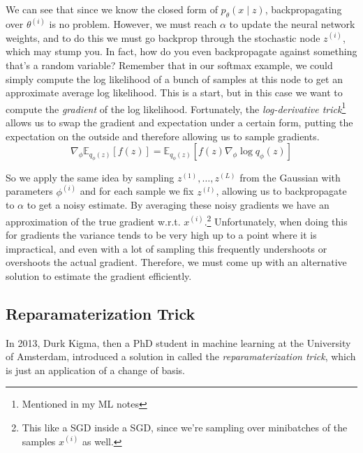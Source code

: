   We can see that since we know the closed form of $p_\theta (x \mid z)$, backpropagating over $\theta^{(i)}$ is no problem. However, we must reach $\alpha$ to update the neural network weights, and to do this we must go backprop through the stochastic node $z^{(i)}$, which may stump you. In fact, how do you even backpropagate against something that's a random variable? Remember that in our softmax example, we could simply compute the log likelihood of a bunch of samples at this node to get an approximate average log likelihood. This is a start, but in this case we want to compute the \textit{gradient} of the log likelihood. Fortunately, the \textit{log-derivative trick}\footnote{Mentioned in my ML notes} allows us to swap the gradient and expectation under a certain form, putting the expectation on the outside and therefore allowing us to sample gradients. 
  \begin{equation}
    \nabla_\phi \mathbb{E}_{q_\phi (z)} [f(z)] = \mathbb{E}_{q_\phi (z)} [ f(z) \nabla_\phi \log q_{\phi} (z)]
  \end{equation}

  So we apply the same idea by sampling $z^{(1)}, \ldots, z^{(L)}$ from the Gaussian with parameters $\phi^{(i)}$ and for each sample we fix $z^{(l)}$, allowing us to backpropagate to $\alpha$ to get a noisy estimate. By averaging these noisy gradients we have an approximation of the true gradient w.r.t. $x^{(i)}$.\footnote{This like a SGD inside a SGD, since we're sampling over minibatches of the samples $x^{(i)}$ as well.} Unfortunately, when doing this for gradients the variance tends to be very high up to a point where it is impractical, and even with a lot of sampling this frequently undershoots or overshoots the actual gradient. Therefore, we must come up with an alternative solution to estimate the gradient efficiently. 

\subsection{Reparamaterization Trick} 

  In 2013, Durk Kigma, then a PhD student in machine learning at the University of Amsterdam, introduced a solution in \cite{vae} called the \textit{reparamaterization trick}, which is just an application of a change of basis. 

